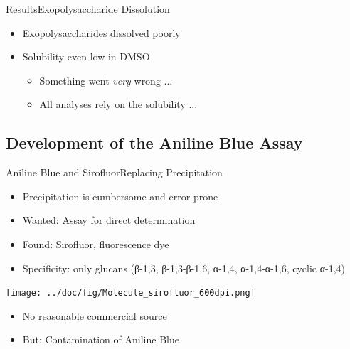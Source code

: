 \documentclass[mathserif]{beamer}
\newcommand{\EPS}{Exopolysaccharide}
\begin{document}
\begin{frame}{Results}{\EPS{} Dissolution}
	\begin{itemize}
		\item \EPS{}s dissolved poorly
		\pause
		\item Solubility even low in DMSO
		\pause
			\begin{itemize}
				\item Something went \textit{very} wrong ...
				\pause
				\item All analyses rely on the solubility ...
			\end{itemize}
	\end{itemize}
\end{frame}

\subsection{Development of the Aniline Blue Assay}

\begin{frame}{Aniline Blue and Sirofluor}{Replacing Precipitation}
	\begin{itemize}
		\item Precipitation is cumbersome and error-prone
		\pause
		\item Wanted: Assay for direct determination
		\pause
		\item Found: Sirofluor, fluorescence dye
		\item Specificity: only glucans (β-1,3, β-1,3-β-1,6, α-1,4, α-1,4-α-1,6, cyclic α-1,4)
	\end{itemize}
	\pause
	\begin{center}
		\texttt{[image: ../doc/fig/Molecule\_sirofluor\_600dpi.png]}
	\end{center}
	\pause
	\begin{itemize}
		\item No reasonable commercial source
		\pause
		\item But: Contamination of Aniline Blue
	\end{itemize}
\end{frame}
\end{document}
